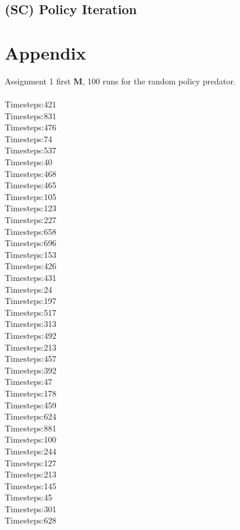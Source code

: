 \documentclass{article}
\begin{document}
\subsection{(SC) Policy Iteration}

\newpage
\section{Appendix}
Assignment 1 first \textbf{M}, 100 runs for the random policy predator.\\\\
Timesteps:421\\
Timesteps:831\\
Timesteps:476\\
Timesteps:74\\
Timesteps:537\\
Timesteps:40\\
Timesteps:468\\
Timesteps:465\\
Timesteps:105\\
Timesteps:123\\
Timesteps:227\\
Timesteps:658\\
Timesteps:696\\
Timesteps:153\\
Timesteps:426\\
Timesteps:431\\
Timesteps:24\\
Timesteps:197\\
Timesteps:517\\
Timesteps:313\\
Timesteps:492\\
Timesteps:213\\
Timesteps:457\\
Timesteps:392\\
Timesteps:47\\
Timesteps:178\\
Timesteps:459\\
Timesteps:624\\
Timesteps:881\\
Timesteps:100\\
Timesteps:244\\
Timesteps:127\\
Timesteps:213\\
Timesteps:145\\
Timesteps:45\\
Timesteps:301\\
Timesteps:628\\
\end{document}
